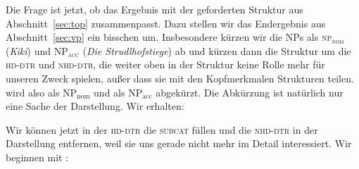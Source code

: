 \documentclass[10pt,a3paper]{article}
\newcommand{\rot}[1]{\textcolor{rot}{#1}}
\newcommand{\gruen}[1]{\textcolor{gruen}{#1}}
\newcommand{\tuerkis}[1]{\textcolor{tuerkis}{#1}}
\newcommand{\braun}[1]{\textcolor{braun}{#1}}
\newcommand*{\mybox}[1]{\framebox{#1}}
\newcommand{\Sub}[1]{\ensuremath{_{\text{#1}}}}
\newcommand{\Zeile}{\vspace{\baselineskip}}
\begin{document}
Die Frage ist jetzt, ob das Ergebnis mit der geforderten Struktur aus Abschnitt~\ref{sec:top} zusammenpasst.
Dazu stellen wir das Endergebnis aus Abschnitt~\ref{sec:vp} ein bisschen um.
Insbesondere kürzen wir die NPs als \textsc{np\Sub{nom}} (\textit{Kiki}) und \textsc{NP\Sub{acc}} (\textit{Die Strudlhofstiege}) ab und kürzen dann die Struktur um die \textsc{hd-dtr} und \textsc{nhd-dtr}, die weiter oben in der Struktur keine Rolle mehr für unseren Zweck spielen, außer dass sie mit den Kopfmerkmalen Strukturen teilen.
\mybox{104} wird also als NP\Sub{nom} und \mybox{101} als NP\Sub{acc} abgekürzt.
Die Abkürzung ist natürlich nur eine Sache der Darstellung.
Wir erhalten:

\Zeile


\Zeile

Wir können jetzt in der \textsc{hd-dtr} die \textsc{subcat} füllen und die \textsc{nhd-dtr} in der Darstellung entfernen, weil sie uns gerade nicht mehr im Detail interessiert.
Wir beginnen mit \mybox{101}:

\Zeile
\end{document}
